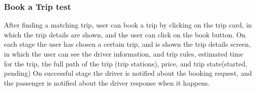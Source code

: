 \documentclass[a4paper, 12pt]{report} %
\begin{document}
                \subsubsection{Book a Trip test}
                After finding a matching trip, user can book a trip by clicking on the trip card, in which the trip details are shown, and the user can click on the book button.
                On each stage the user has chosen a certain trip, and is shown the trip details screen, in which the user can see the driver information, and trip rules, estimated time for the trip, the full path of the trip (trip stations), price, and trip state(started, pending)
                On successful stage the driver is notified about the booking request, and the passenger is notified about the driver response when it happens.
\end{document}
